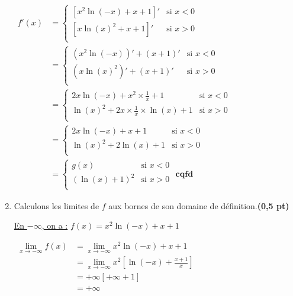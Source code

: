 \documentclass[12pt,a4paper]{article}
\begin{document}
\begin{enumerate}
          \(
          \begin{aligned}
              f'(x) & =
              \begin{cases}
                  [x^2 \ln(-x) + x + 1]' & \text{si } x < 0 \\
                  [x \ln(x)^2 + x + 1]'  & \text{si } x > 0 \\
              \end{cases}       \\
                    & =
              \begin{cases}
                  (x^2 \ln(-x))' + (x + 1)' & \text{si } x < 0 \\
                  (x \ln(x)^2)' + (x + 1)'  & \text{si } x > 0 \\
              \end{cases}                    \\
                    & =
              \begin{cases}
                  2x \ln(-x) + x^2\times\frac{1}{x} + 1        & \text{si } x < 0 \\
                  \ln(x)^2+2x\times\frac{1}{x}\times\ln(x) + 1 & \text{si } x > 0 \\
              \end{cases} \\
                    & =
              \begin{cases}
                  2x \ln(-x) + x + 1   & \text{si } x < 0 \\
                  \ln(x)^2+2\ln(x) + 1 & \text{si } x > 0 \\
              \end{cases}                         \\
                    & =
              \begin{cases}
                  g(x)           & \text{si } x < 0 \\
                  (\ln(x)+1)^{2} & \text{si } x > 0 \\
              \end{cases}\textbf{ cqfd}
          \end{aligned}
          \)

    \item Calculons les limites de \( f \) aux bornes de son domaine de définition.\hfill \textbf{(0,5 pt)}

          \underline{En \( -\infty \), on a :} \( f(x) = x^2 \ln(-x) + x + 1 \)

          \(
          \begin{aligned}
              \lim\limits_{x\to -\infty} f(x) & = \lim\limits_{x\to -\infty} x^2 \ln(-x) + x + 1                          \\
                                              & = \lim\limits_{x\to -\infty} x^{2} \left[\ln(-x) + \frac{x + 1}{x}\right] \\
                                              & = +\infty \left[+\infty+1 \right]                                         \\
                                              & =+\infty
          \end{aligned}
          \)


\end{enumerate}
\end{document}
